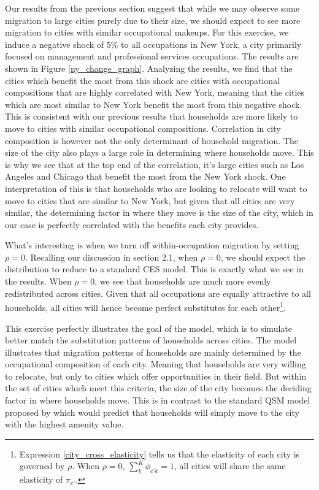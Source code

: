 \documentclass[10pt]{article}
\begin{document}
Our results from the previous section suggest that while we may observe some migration to large cities purely due to their size, we should expect to see more migration to cities with similar occupational makeups. For this exercise, we induce a negative shock of 5\% to all occupations in New York, a city primarily focused on management and professional services occupations. The results are shown in Figure \ref{ny_change_graph}. Analyzing the results, we find that the cities which benefit the most from this shock are cities with occupational compositions that are highly correlated with New York, meaning that the cities which are most similar to New York benefit the most from this negative shock. This is consistent with our previous results that households are more likely to move to cities with similar occupational compositions. Correlation in city composition is however not the only determinant of household migration. The size of the city also plays a large role in determining where households move. This is why we see that at the top end of the correlation, it's large cities such as Los Angeles and Chicago that benefit the most from the New York shock. One interpretation of this is that households who are looking to relocate will want to move to cities that are similar to New York, but given that all cities are very similar, the determining factor in where they move is the size of the city, which in our case is perfectly correlated with the benefits each city provides.

What's interesting is when we turn off within-occupation migration by setting $\rho = 0$. Recalling our discussion in section 2.1, when $\rho = 0$, we should expect the distribution to reduce to a standard CES model. This is exactly what we see in the results. When $\rho = 0$, we see that households are much more evenly redistributed across cities. Given that all occupations are equally attractive to all households, all cities will hence become perfect substitutes for each other\footnote{Expression \ref{city_cross_elasticity} tells us that the elasticity of each city is governed by $\rho$. When $\rho = 0$, $\sum_{k}^{K} \phi_{c'k} = 1$, all cities will share the same elasticity of $\pi_{c'}.$}.

This exercise perfectly illustrates the goal of the model, which is to simulate better match the substitution patterns of households across cities. The model illustrates that migration patterns of households are mainly determined by the occupational composition of each city. Meaning that households are very willing to relocate, but only to cities which offer opportunities in their field. But within the set of cities which meet this criteria, the size of the city becomes the deciding factor in where households move. This is in contrast to the standard QSM model proposed by \cite{redding} which would predict that households will simply move to the city with the highest amenity value.
\end{document}
